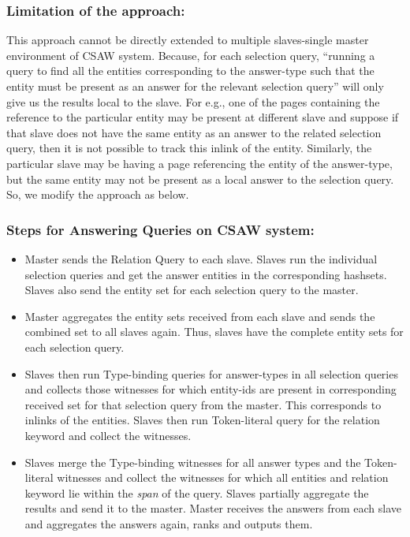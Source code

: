 \documentclass[11pt]{report}
\begin{document}
\subsubsection*{Limitation of the approach:}
This approach cannot be directly extended to multiple slaves-single master environment of CSAW system. Because, for each selection query, ``running a query to find all 
the entities corresponding to the answer-type such that the entity must be present as an answer for the relevant selection query'' will only give us the results local to 
the slave. For e.g., one of the pages containing the reference to the particular entity may be present at different slave and suppose if that slave does not have the same 
entity as an answer to the related selection query, then it is not possible to track this inlink of the entity. Similarly, the particular slave may be having a page referencing
the entity of the answer-type, but the same entity may not be present as a local answer to the selection query. So, we modify the approach as below.

\subsubsection*{Steps for Answering Queries on CSAW system:}
\begin{itemize}
 \item Master sends the Relation Query to each slave. Slaves run the individual selection queries and get the answer entities in the corresponding hashsets.
 Slaves also send the entity set for each selection query to the master.
 \item Master aggregates the entity sets received from each slave and sends the combined set to all slaves again. Thus, slaves have the complete entity sets for each selection query. 
 \item Slaves then run Type-binding queries for answer-types in all selection queries and collects those witnesses for which entity-ids are present in corresponding 
received set for that selection query from the master. This corresponds to inlinks of the entities. Slaves then run Token-literal query for the relation keyword and 
collect the witnesses.
 \item Slaves merge the Type-binding witnesses for all answer types and the Token-literal witnesses and collect the witnesses for which all entities and relation keyword lie within
the \textit{span} of the query. Slaves partially aggregate the results and send it to the master. Master receives the answers from each slave and aggregates the answers again, ranks and outputs them. 
\end{itemize}
\end{document}

